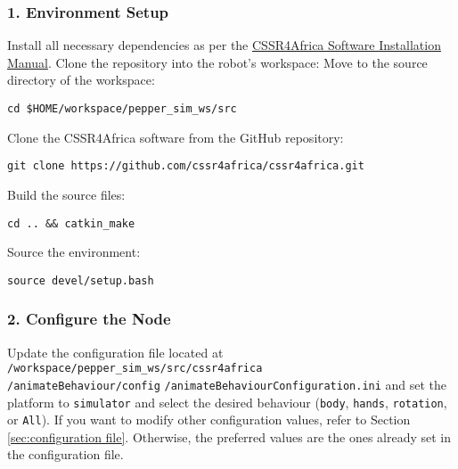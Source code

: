 \documentclass{CSSRforAfrica}
\begin{document}
\subsubsection*{1. Environment Setup}
Install all necessary dependencies as per the \href{https://github.com/cssr4africa/cssr4africa/blob/main/docs/D3.3_Software_Installation_Manual.pdf}{CSSR4Africa Software Installation Manual}. Clone the repository into the robot's workspace:
Move to the source directory of the workspace:\\
\begin{lstlisting}[style=linuxbashstyle]
cd $HOME/workspace/pepper_sim_ws/src
\end{lstlisting}
Clone the CSSR4Africa software from the GitHub repository:\\
\begin{lstlisting}[style=linuxbashstyle]
git clone https://github.com/cssr4africa/cssr4africa.git
\end{lstlisting}
 Build the source files:\\
\begin{lstlisting}[style=linuxbashstyle]
cd .. && catkin_make
\end{lstlisting}
Source the environment:\\
\begin{lstlisting}[style=linuxbashstyle]
source devel/setup.bash
\end{lstlisting}

\subsubsection*{2. Configure the Node}
Update the configuration file located at \texttt{/workspace/pepper\_sim\_ws/src/cssr4africa}\\
\texttt{/animateBehaviour/config}
\texttt{/animateBehaviourConfiguration.ini} and set the platform to \texttt{simulator} and select the desired behaviour (\texttt{body}, \texttt{hands}, \texttt{rotation}, or \texttt{All}). If you want to modify other configuration values, refer to Section \ref{sec:configuration file}. Otherwise, the preferred values are the ones already set in the configuration file.
\end{document}
